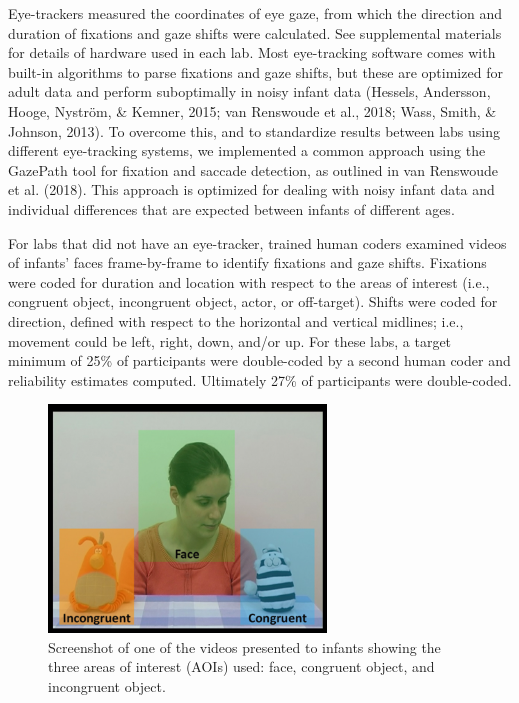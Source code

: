 \documentclass[english,,man,floatsintext]{apa6}
\begin{document}
Eye-trackers measured the coordinates of eye gaze, from which the direction and duration of fixations and gaze shifts were calculated. See supplemental materials for details of hardware used in each lab. Most eye-tracking software comes with built-in algorithms to parse fixations and gaze shifts, but these are optimized for adult data and perform suboptimally in noisy infant data (Hessels, Andersson, Hooge, Nyström, \& Kemner, 2015; van Renswoude et al., 2018; Wass, Smith, \& Johnson, 2013). To overcome this, and to standardize results between labs using different eye-tracking systems, we implemented a common approach using the GazePath tool for fixation and saccade detection, as outlined in van Renswoude et al. (2018). This approach is optimized for dealing with noisy infant data and individual differences that are expected between infants of different ages.

For labs that did not have an eye-tracker, trained human coders examined videos of infants' faces frame-by-frame to identify fixations and gaze shifts. Fixations were coded for duration and location with respect to the areas of interest (i.e., congruent object, incongruent object, actor, or off-target). Shifts were coded for direction, defined with respect to the horizontal and vertical midlines; i.e., movement could be left, right, down, and/or up. For these labs, a target minimum of 25\% of participants were double-coded by a second human coder and reliability estimates computed. Ultimately 27\% of participants were double-coded.

\begin{figure}

{\centering \includegraphics[width=2.91in]{Figure1} 

}

\caption{Screenshot of one of the videos presented to infants showing the three areas of interest (AOIs) used: face, congruent object, and incongruent object.}\label{fig:fig1}
\end{figure}
\end{document}

